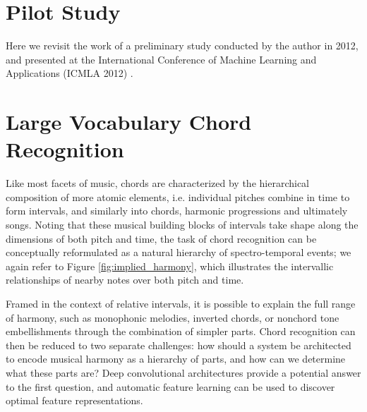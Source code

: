 



\section{Pilot Study}
\label{sec:pilot_study}

Here we revisit the work of a preliminary study conducted by the author in 2012, and presented at the International Conference of Machine Learning and Applications (ICMLA 2012) \cite{Humphrey2012}.







\section{Large Vocabulary Chord Recognition}

Like most facets of music, chords are characterized by the hierarchical composition of more atomic elements, i.e. individual pitches combine in time to form intervals, and similarly into chords, harmonic progressions and ultimately songs.
Noting that these musical building blocks of intervals take shape along the dimensions of both pitch and time, the task of chord recognition can be conceptually reformulated as a natural hierarchy of spectro-temporal events; we again refer to Figure \ref{fig:implied_harmony}, which illustrates the intervallic relationships of nearby notes over both pitch and time.

Framed in the context of relative intervals, it is possible to explain the full range of harmony, such as monophonic melodies, inverted chords, or nonchord tone embellishments through the combination of simpler parts.
Chord recognition can then be reduced to two separate challenges: how should a system be architected to encode musical harmony as a hierarchy of parts, and how can we determine what these parts are?
Deep convolutional architectures provide a potential answer to the first question, and automatic feature learning can be used to discover optimal feature representations.

